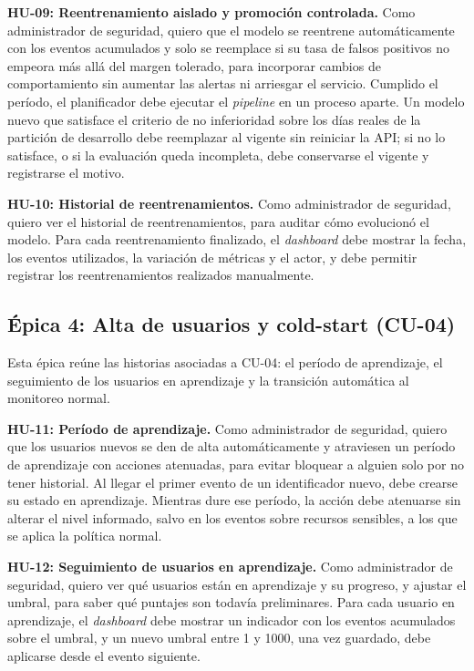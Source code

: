 \textbf{HU-09: Reentrenamiento aislado y promoción controlada.} Como administrador de seguridad, quiero que el modelo se reentrene automáticamente con los eventos acumulados y solo se reemplace si su tasa de falsos positivos no empeora más allá del margen tolerado, para incorporar cambios de comportamiento sin aumentar las alertas ni arriesgar el servicio. Cumplido el período, el planificador debe ejecutar el \emph{pipeline} en un proceso aparte. Un modelo nuevo que satisface el criterio de no inferioridad sobre los días reales de la partición de desarrollo debe reemplazar al vigente sin reiniciar la API; si no lo satisface, o si la evaluación queda incompleta, debe conservarse el vigente y registrarse el motivo.

\textbf{HU-10: Historial de reentrenamientos.} Como administrador de seguridad, quiero ver el historial de reentrenamientos, para auditar cómo evolucionó el modelo. Para cada reentrenamiento finalizado, el \emph{dashboard} debe mostrar la fecha, los eventos utilizados, la variación de métricas y el actor, y debe permitir registrar los reentrenamientos realizados manualmente.

\subsection{Épica 4: Alta de usuarios y cold-start (CU-04)}

Esta épica reúne las historias asociadas a CU-04: el período de aprendizaje, el seguimiento de los usuarios en aprendizaje y la transición automática al monitoreo normal.

\textbf{HU-11: Período de aprendizaje.} Como administrador de seguridad, quiero que los usuarios nuevos se den de alta automáticamente y atraviesen un período de aprendizaje con acciones atenuadas, para evitar bloquear a alguien solo por no tener historial. Al llegar el primer evento de un identificador nuevo, debe crearse su estado en aprendizaje. Mientras dure ese período, la acción debe atenuarse sin alterar el nivel informado, salvo en los eventos sobre recursos sensibles, a los que se aplica la política normal.

\textbf{HU-12: Seguimiento de usuarios en aprendizaje.} Como administrador de seguridad, quiero ver qué usuarios están en aprendizaje y su progreso, y ajustar el umbral, para saber qué puntajes son todavía preliminares. Para cada usuario en aprendizaje, el \emph{dashboard} debe mostrar un indicador con los eventos acumulados sobre el umbral, y un nuevo umbral entre 1 y 1000, una vez guardado, debe aplicarse desde el evento siguiente.

